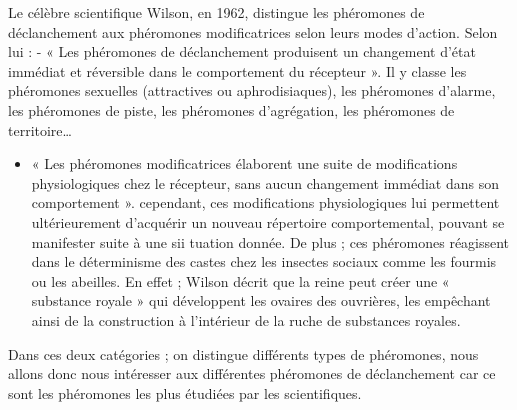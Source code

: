 Le célèbre scientifique Wilson, en 1962, distingue les phéromones de
déclanchement aux phéromones modificatrices selon leurs modes d'action.
Selon lui : - « Les phéromones de déclanchement produisent un changement
d'état immédiat et réversible dans le comportement du récepteur ». Il y
classe les phéromones sexuelles (attractives ou aphrodisiaques), les
phéromones d'alarme, les phéromones de piste, les phéromones
d'agrégation, les phéromones de territoire\ldots{}

\begin{itemize}
\itemsep1pt\parskip0pt
	\item « Les phéromones modificatrices élaborent une suite de modifications physiologiques chez le récepteur, sans aucun changement immédiat dans son comportement ». cependant, ces modifications physiologiques lui
	permettent ultérieurement d'acquérir un nouveau répertoire
	comportemental, pouvant se manifester suite à une sii tuation donnée. De
	plus ; ces phéromones réagissent dans le déterminisme des castes chez
	les insectes sociaux comme les fourmis ou les abeilles. En effet ;
	Wilson décrit que la reine peut créer une « substance royale » qui
	développent les ovaires des ouvrières, les empêchant ainsi de la
	construction à l'intérieur de la ruche de substances royales.
\end{itemize}

Dans ces deux catégories ; on distingue différents types de phéromones,
nous allons donc nous intéresser aux différentes phéromones de
déclanchement car ce sont les phéromones les plus étudiées par les
scientifiques.

